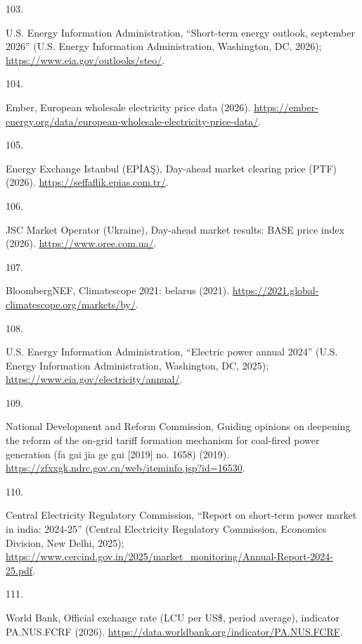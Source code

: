 \documentclass[
  letterpaper,
]{article}
\newlength{\cslhangindent}
\newlength{\csllabelwidth}
\newenvironment{CSLReferences}[2] %
 {\begin{list}{}{%
  \setlength{\itemindent}{0pt}
  \setlength{\leftmargin}{0pt}
  \setlength{\parsep}{0pt}
  \ifodd #1
   \setlength{\leftmargin}{\cslhangindent}
   \setlength{\itemindent}{-1\cslhangindent}
  \fi
  \setlength{\itemsep}{#2\baselineskip}}}
 {\end{list}}
\newcommand{\CSLLeftMargin}[1]{\parbox[t]{\csllabelwidth}{\strut#1\strut}}
\newcommand{\CSLRightInline}[1]{\parbox[t]{\linewidth - \csllabelwidth}{\strut#1\strut}}
\begin{document}
\begin{CSLReferences}{0}{1}
\CSLLeftMargin{103. }%
\CSLRightInline{U.S. Energy Information Administration, {``Short-term
energy outlook, september 2026''} (U.S. Energy Information
Administration, Washington, DC, 2026);
\url{https://www.eia.gov/outlooks/steo/}.}

\CSLLeftMargin{104. }%
\CSLRightInline{Ember, European wholesale electricity price data (2026).
\url{https://ember-energy.org/data/european-wholesale-electricity-price-data/}.}

\CSLLeftMargin{105. }%
\CSLRightInline{Energy Exchange Istanbul (EPİAŞ), Day-ahead market
clearing price (PTF) (2026). \url{https://seffaflik.epias.com.tr/}.}

\CSLLeftMargin{106. }%
\CSLRightInline{JSC Market Operator (Ukraine), Day-ahead market results:
BASE price index (2026). \url{https://www.oree.com.ua/}.}

\CSLLeftMargin{107. }%
\CSLRightInline{BloombergNEF, Climatescope 2021: belarus (2021).
\url{https://2021.global-climatescope.org/markets/by/}.}

\CSLLeftMargin{108. }%
\CSLRightInline{U.S. Energy Information Administration, {``Electric
power annual 2024''} (U.S. Energy Information Administration,
Washington, DC, 2025); \url{https://www.eia.gov/electricity/annual/}.}

\CSLLeftMargin{109. }%
\CSLRightInline{National Development and Reform Commission, Guiding
opinions on deepening the reform of the on-grid tariff formation
mechanism for coal-fired power generation (fa gai jia ge gui {[}2019{]}
no. 1658) (2019).
\url{https://zfxxgk.ndrc.gov.cn/web/iteminfo.jsp?id=16530}.}

\CSLLeftMargin{110. }%
\CSLRightInline{Central Electricity Regulatory Commission, {``Report on
short-term power market in india: 2024-25''} (Central Electricity
Regulatory Commission, Economics Division, New Delhi, 2025);
\url{https://www.cercind.gov.in/2025/market_monitoring/Annual-Report-2024-25.pdf}.}

\CSLLeftMargin{111. }%
\CSLRightInline{World Bank, Official exchange rate (LCU per US\$, period
average), indicator PA.NUS.FCRF (2026).
\url{https://data.worldbank.org/indicator/PA.NUS.FCRF}.}


\end{CSLReferences}
\end{document}
